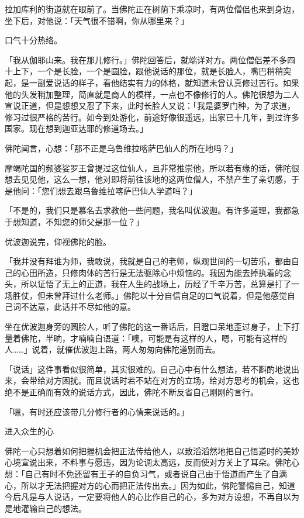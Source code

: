 \documentclass[12pt,twoside,openany]{book}
\begin{document}
拉加库利的街道就在眼前了。当佛陀正在树荫下乘凉时，有两位僧侣也来到身边，坐下后，对他说：「天气很不错啊，你从哪里来？」

口气十分热络。

「我从伽耶山来。我在那儿修行。」佛陀回答后，就端详对方。两位僧侣差不多四十上下，一个是长脸，一个是圆脸，跟他说话的那位，就是长脸人，嘴巴稍稍突起，是一副爱说话的样子，看他结实有力的体格，就知道未曾认真修过苦行。如果他的头发稍加整理，简直就是商人的模样，一点也不像修行的人。佛陀很想为二人宣说正道，但是想想又忍了下来，此时长脸人又说：「我是婆罗门种，为了求道，修习过很严格的苦行。如今到处游化，前途好像很遥远，出家已十几年，到过许多国家。现在想到迦亚达耶的修道场去。」

佛陀闻言，心想：「那不正是乌鲁维拉喀萨巴仙人的所在地吗？」

摩竭陀国的频婆娑罗王曾提过这位仙人，且非常推崇他，所以若有缘的话，佛陀很想去见见他，这么一想，他对即将前往该地的这两位僧人，不禁产生了亲切感，于是他问：「您们想去跟乌鲁维拉喀萨巴仙人学道吗？」

「不是的，我们只是慕名去求教他一些问题，我名叫优波迦。有许多道理，我都急于想知道，不知您的师父是那一位？」

优波迦说完，仰视佛陀的脸。

「我并没有拜谁为师，我敢说，我就是自己的老师，纵观世间的一切苦乐，都由自己的心田所造，只修肉体的苦行是无法驱除心中烦恼的。我因为能去掉执着的念头，所以证悟了无上的正道，我在人生的战场上，历经了千辛万苦，总算是打了一场胜仗，但未曾拜过什么老师。」佛陀以十分自信自足的口气说着，但是他感觉自己词不达意，此话并不尽如他的意。

坐在优波迦身旁的圆脸人，听了佛陀的这一番话后，目瞪口呆地歪过身子，上下打量着佛陀，半晌，才喃喃自语道：「噢，可能是有这样的人，嗯，可能有这样的人……」说着，就催优波迦上路，两人匆匆向佛陀道别而去。

「说话」这件事看似很简单，其实很难的。自己心中有什么想法，若不斟酌地说出来，会带给对方困扰。而且说话时若不站在对方的立场，给对方思考的机会，这也绝不是正确而有效的说话方式，因此，佛陀不断反省自己刚刚的言行。

「嗯，有时还应该带几分修行者的心情来说话的。」

进入众生的心

佛陀一心只想着如何把握机会把正法传给他人，以致滔滔然地把自己悟道时的美妙心境宣说出来，不料事与愿违，因为论调太高远，反而使对方关上了耳朵。佛陀心想：「自己有时不免还留有王子的自负习气，或者说自己由于悟道而产生了自满心，所以才无法把握对方的心而把正法传出去。」因为如此，佛陀警惕自己，知道今后凡是与人说话，一定要将他人的心比作自己的心，多为对方设想，不再自以为是地灌输自己的想法。
\end{document}
